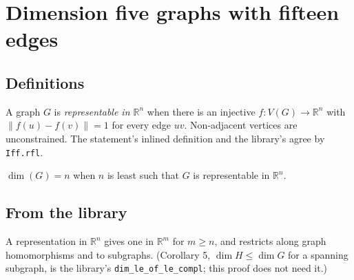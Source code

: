 %
%

\chapter{Dimension five graphs with fifteen edges}

\section{Definitions}

\begin{definition}
  \label{def:representable}
  \leanok
  A graph $G$ is \emph{representable in $\mathbb{R}^n$} when there is an injective
  $f : V(G) \to \mathbb{R}^n$ with $\lVert f(u) - f(v)\rVert = 1$ for every edge $uv$.
  Non-adjacent vertices are unconstrained. The statement's inlined definition and the library's
  agree by \texttt{Iff.rfl}.
\end{definition}

\begin{definition}[Dimension]
  \label{def:dimension}
  \leanok
  $\dim(G) = n$ when $n$ is least such that $G$ is representable in $\mathbb{R}^n$.
\end{definition}

\section{From the library}

\begin{lemma}
  \label{lem:monotone}
  \leanok
  A representation in $\mathbb{R}^n$ gives one in $\mathbb{R}^m$ for $m \ge n$, and restricts along
  graph homomorphisms and to subgraphs. (Corollary 5, $\dim H \le \dim G$ for a spanning subgraph, is
  the library's \texttt{dim\_le\_of\_le\_compl}; this proof does not need it.)
\end{lemma}

